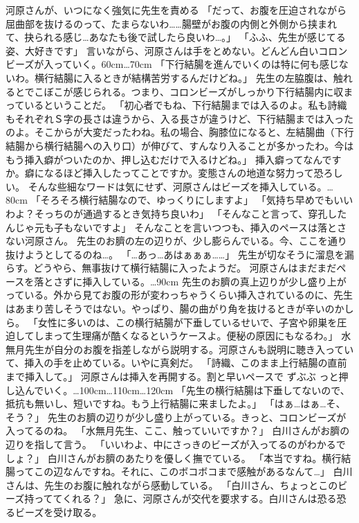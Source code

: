 河原さんが、いつになく強気に先生を責める
「だって、お腹を圧迫されながら屈曲部を抜けるのって、たまらないわ……腸壁がお腹の内側と外側から挟まれて、抉られる感じ…あなたも後で試したら良いわ…。」
「ふふ、先生が感じてる姿、大好きです」
言いながら、河原さんは手をとめない。どんどん白いコロンビーズが入っていく。60cm…70cm
「下行結腸を進んでいくのは特に何も感じないわ。横行結腸に入るときが結構苦労するんだけどね。」
先生の左脇腹は、触れるとでこぼこが感じられる。つまり、コロンビーズがしっかり下行結腸内に収まっているということだ。
「初心者でもね、下行結腸までは入るのよ。私も詩織もそれぞれＳ字の長さは違うから、入る長さが違うけど、下行結腸までは入ったのよ。そこからが大変だったわね。私の場合、胸膝位になると、左結腸曲（下行結腸から横行結腸への入り口）が伸びて、すんなり入ることが多かったわ。今はもう挿入癖がついたのか、押し込むだけで入るけどね。」
挿入癖ってなんですか。癖になるほど挿入したってことですか。変態さんの地道な努力って恐ろしい。
そんな些細なワードは気にせず、河原さんはビーズを挿入している。…80cm
「そろそろ横行結腸なので、ゆっくりにしますよ」
「気持ち早めでもいいわよ？そっちのが通過するとき気持ち良いわ」
「そんなこと言って、穿孔したんじゃ元も子もないですよ」
そんなことを言いつつも、挿入のペースは落とさない河原さん。
先生のお臍の左の辺りが、少し膨らんでいる。今、ここを通り抜けようとしてるのね…。
「…あっ…あはぁぁぁ……」
先生が切なそうに溜息を漏らす。どうやら、無事抜けて横行結腸に入ったようだ。
河原さんはまだまだペースを落とさずに挿入している。…90cm
先生のお臍の真上辺りが少し盛り上がっている。外から見てお腹の形が変わっちゃうくらい挿入されているのに、先生はあまり苦しそうではない。やっぱり、腸の曲がり角を抜けるときが辛いのかしら。
「女性に多いのは、この横行結腸が下垂しているせいで、子宮や卵巣を圧迫してしまって生理痛が酷くなるというケースよ。便秘の原因にもなるわ。」
水無月先生が自分のお腹を指差しながら説明する。河原さんも説明に聴き入っていて、挿入の手を止めている。いやに真剣だ。
「詩織、このまま上行結腸の直前まで挿入して。」
河原さんは挿入を再開する。割と早いペースで ずぶぶ っと押し込んでいく。…100cm…110cm…120cm
「先生の横行結腸は下垂してないので、抵抗も無いし、短いですね。もう上行結腸に来ましたよ。」
「はぁ…はぁ…そ、そう？」
先生のお臍の辺りが少し盛り上がっている。きっと、コロンビーズが入ってるのね。
「水無月先生、ここ、触っていいですか？」
白川さんがお臍の辺りを指して言う。
「いいわよ、中にさっきのビーズが入ってるのがわかるでしょ？」
白川さんがお臍のあたりを優しく撫でている。
「本当ですね。横行結腸ってこの辺なんですね。それに、このボコボコまで感触があるなんて…」
白川さんは、先生のお腹に触れながら感動している。
「白川さん、ちょっとこのビーズ持っててくれる？」
急に、河原さんが交代を要求する。白川さんは恐る恐るビーズを受け取る。
